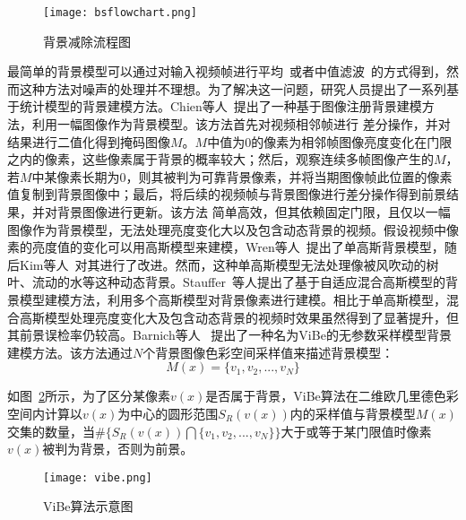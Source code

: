 \begin{figure}[h]
  \centering%
  {\texttt{[image: bsflowchart.png]}}%
  \caption{背景减除流程图~\cite{BouwmansOverview}}
  \label{fig:2}
\end{figure}
最简单的背景模型可以通过对输入视频帧进行平均~\cite{LeeAverage}或者中值滤波~\cite{MF}的方式得到，然而这种方法对噪声的处理并不理想。为了解决这一问题，研究人员提出了一系列基于统计模型的背景建模方法。Chien等人~\cite{Chien2002Efficient}提出了一种基于图像注册背景建模方法，利用一幅图像作为背景模型。该方法首先对视频相邻帧进行
差分操作，并对结果进行二值化得到掩码图像$M$。$M$中值为0的像素为相邻帧图像亮度变化在门限之内的像素，这些像素属于背景的概率较大；然后，观察连续多帧图像产生的$M$，若$M$中某像素长期为0，则其被判为可靠背景像素，并将当期图像帧此位置的像素值复制到背景图像中；最后，将后续的视频帧与背景图像进行差分操作得到前景结果，并对背景图像进行更新。该方法
简单高效，但其依赖固定门限，且仅以一幅图像作为背景模型，无法处理亮度变化大以及包含动态背景的视频。假设视频中像素的亮度值的变化可以用高斯模型来建模，Wren等人~\cite{Wren}提出了单高斯背景模型，随后Kim等人~\cite{kim2007robust}对其进行了改进。然而，这种单高斯模型无法处理像被风吹动的树叶、流动的水等这种动态背景。Stauffer~\cite{stauffer1999adaptive}等人提出了基于自适应混合高斯模型的背景模型建模方法，利用多个高斯模型对背景像素进行建模。相比于单高斯模型，混合高斯模型处理亮度变化大及包含动态背景的视频时效果虽然得到了显著提升，但其前景误检率仍较高。Barnich等人~ \cite{Barnich2011ViBe}提出了一种名为ViBe的无参数采样模型背景建模方法。该方法通过$N$个背景图像色彩空间采样值来描述背景模型：
$$M(x)=\{v_{1},v_{2},...,v_{N}\}$$ \par
如图~\ref{fig:vibe}所示，为了区分某像素$v(x)$是否属于背景，ViBe算法在二维欧几里德色彩空间内计算以$v(x)$为中心的圆形范围$S_{R}(v(x))$内的采样值与背景模型$M(x)$交集的数量，当$\#\{S_{R}(v(x))\bigcap\{v_{1},v_{2},...,v_{N}\} \}$大于或等于某门限值时像素$v(x)$被判为背景，否则为前景。

\begin{figure}[h]
  \centering%
  {\texttt{[image: vibe.png]}}%
  \caption{ViBe算法示意图~\cite{Barnich2011ViBe}}
  \label{fig:vibe}
\end{figure} \par


